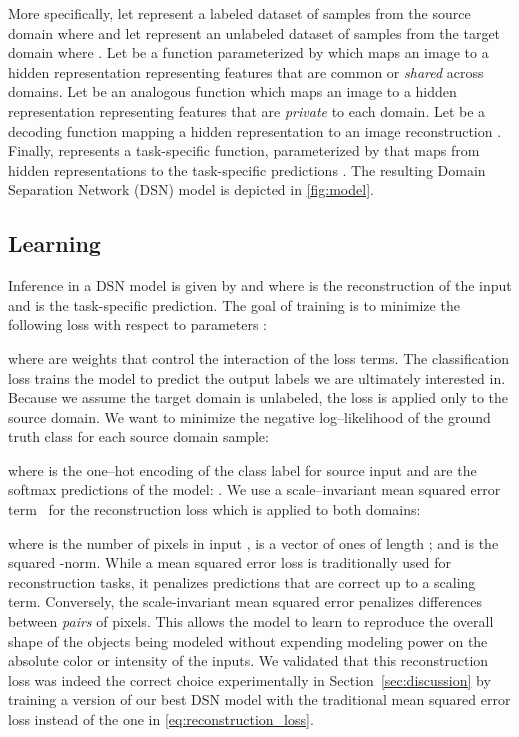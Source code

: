\documentclass{article}
\begin{document}
More specifically, 
let  represent a labeled dataset
of  samples from the source domain where  and let
 represent an unlabeled dataset of 
samples from the target domain where . Let
 be a function parameterized by  which maps
an image  to a hidden representation  representing features 
that are common or
\textit{shared} across domains. Let  be
an analogous function which maps an image  to a hidden representation
 representing features that are \textit{private} to each domain.
Let  be a decoding function mapping a hidden representation
 to an image reconstruction . Finally, 
represents a task-specific function, parameterized by  that maps from
hidden representations  to the task-specific predictions . The resulting Domain Separation Network (DSN) model is depicted in \autoref{fig:model}.

\subsection{Learning}
\label{sec:learning}
Inference in a DSN model is given by 
and 
where  is the reconstruction of the input  and  is the
task-specific prediction. 
The goal of training is to minimize the following loss with respect to parameters :

 where  are weights that control the interaction of the loss terms.
The classification loss  trains the model
to predict the output labels we are ultimately interested in. Because we assume
the target domain is unlabeled, the loss is applied only to the source domain.
We want to minimize the negative log--likelihood of the ground truth class for each source domain sample:

where  is the one--hot encoding of the class label for source input 
and  are the softmax predictions of the model: .
We use a scale--invariant mean squared error term~\cite{eigen2014depth} for the
reconstruction loss  which is applied to
both domains:

where   is the number of pixels in input ,  is a vector of ones of
length ; and  is the squared -norm. While a mean squared error
loss is traditionally used for reconstruction tasks, it penalizes predictions that
are correct up to a scaling term. Conversely, the
scale-invariant mean squared error penalizes differences between \textit{pairs}
of pixels. This allows the model to learn to reproduce the overall shape of the objects
being modeled without expending modeling power on the absolute color or intensity
of the inputs. We validated that this reconstruction loss was indeed the correct choice experimentally in Section~\ref{sec:discussion} by training a version of our best DSN model with the traditional mean squared error loss instead of the one in \autoref{eq:reconstruction_loss}.
\end{document}
